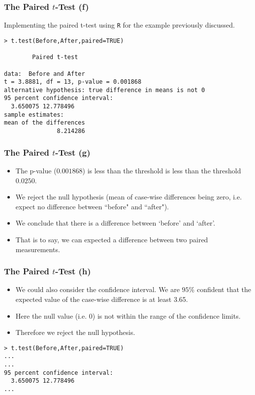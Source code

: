\begin{frame}[fragile]
\frametitle{The Paired $t$-Test (f)}
Implementing the paired t-test using \texttt{R} for the example previously discussed.
\begin{verbatim}
> t.test(Before,After,paired=TRUE)

        Paired t-test

data:  Before and After
t = 3.8881, df = 13, p-value = 0.001868
alternative hypothesis: true difference in means is not 0
95 percent confidence interval:
  3.650075 12.778496
sample estimates:
mean of the differences
               8.214286

\end{verbatim}
\end{frame}

\begin{frame}[fragile]
\frametitle{The Paired $t$-Test (g)}
\begin{itemize}
\item The p-value ($0.001868$) is less than the threshold is less than the threshold $0.0250$.
\item We reject the null hypothesis (mean of case-wise differences being zero, i.e. expect no difference between ``before" and ``after").
\item We conclude that there is a difference between `before' and `after'.
\item That is to say, we can expected a difference between two paired measurements.
\end{itemize}
\end{frame}
\begin{frame}[fragile]
\frametitle{The Paired $t$-Test (h)}
\begin{itemize}
\item We could also consider the confidence interval. We are $95\%$ confident that the expected value of the case-wise difference is at least 3.65.
\item Here the null value (i.e. 0) is not within the range of the confidence limits.
\item Therefore we reject the null hypothesis.
\end{itemize}
\begin{verbatim}
> t.test(Before,After,paired=TRUE)
...
...
95 percent confidence interval:
  3.650075 12.778496
...
\end{verbatim}
\end{frame}

